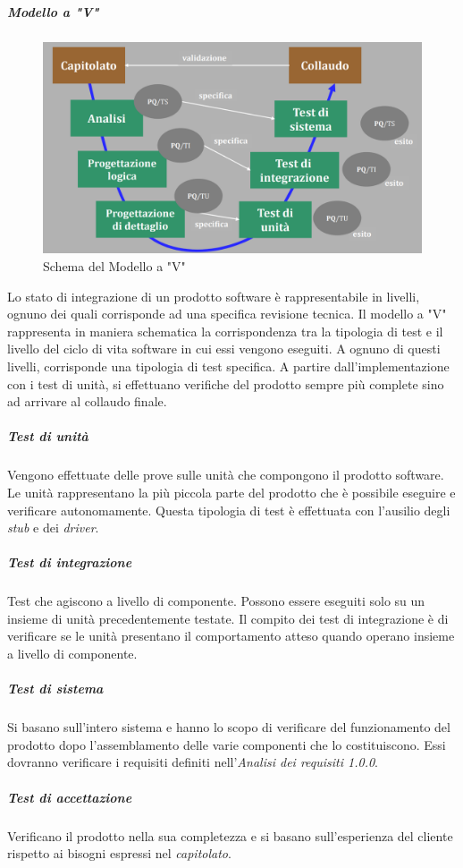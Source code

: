 \subparagraph*{Modello a "V"}
\begin{figure}[h!]
	\caption{Schema del Modello a "V"}
	\centering
	\includegraphics[width=\textwidth]{res/img/modelloV.png}
\end{figure}
Lo stato di integrazione di un prodotto software è rappresentabile in livelli, ognuno dei quali corrisponde ad una specifica revisione tecnica. Il modello a "V" rappresenta in maniera schematica la corrispondenza tra la tipologia di test e il livello del ciclo di vita software in cui essi vengono eseguiti. A ognuno di questi livelli, corrisponde una tipologia di test specifica. A partire dall'implementazione con i test di unità, si effettuano verifiche del prodotto sempre più complete sino ad arrivare al collaudo finale.

\subparagraph*{Test di unità}
Vengono effettuate delle prove sulle unità che compongono il prodotto software. Le unità rappresentano la più piccola parte del prodotto che è possibile eseguire e verificare autonomamente. Questa tipologia di test è effettuata con l'ausilio degli \textit{stub\glo} e dei \textit{driver\glos}.

\subparagraph*{Test di integrazione}
Test che agiscono a livello di componente. Possono essere eseguiti solo su un insieme di unità precedentemente testate. Il compito dei test di integrazione è di verificare se le unità presentano il comportamento atteso quando operano insieme a livello di componente.

\subparagraph*{Test di sistema}
Si basano sull'intero sistema e hanno lo scopo di verificare del funzionamento del prodotto dopo l'assemblamento delle varie componenti che lo costituiscono. Essi dovranno verificare i requisiti definiti nell'\textit{Analisi dei requisiti 1.0.0\docs}.

\subparagraph*{Test di accettazione}
Verificano il prodotto nella sua completezza e si basano sull'esperienza del cliente rispetto ai bisogni espressi nel \textit{capitolato\glos}.

